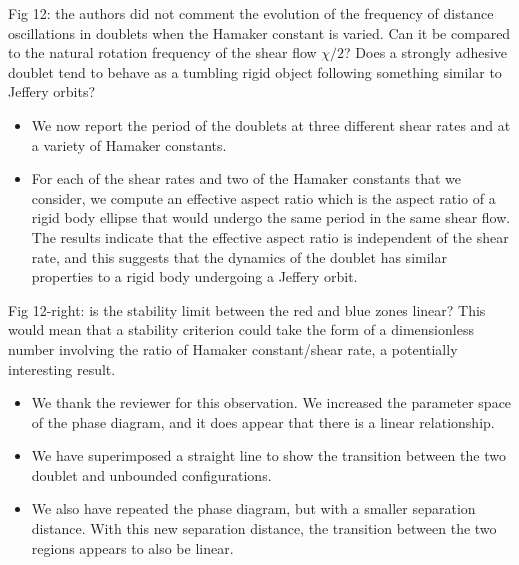 \documentclass[11pt]{article}
\newcommand{\comment}[1]{{\color{blue} #1}}
\begin{document}
\noindent
\comment{Fig 12: the authors did not comment the evolution of the
frequency of distance oscillations in doublets when the Hamaker constant
is varied. Can it be compared to the natural rotation frequency of the
shear flow $\chi/2$? Does a strongly adhesive doublet tend to behave as
a tumbling rigid object following something similar to Jeffery orbits?}
\begin{itemize}
  \item We now report the period of the doublets at three different
    shear rates and at a variety of Hamaker constants.

  \item For each of the shear rates and two of the Hamaker constants
    that we consider, we compute an effective aspect ratio which is the
    aspect ratio of a rigid body ellipse that would undergo the same
    period in the same shear flow.  The results indicate that the
    effective aspect ratio is independent of the shear rate, and this
    suggests that the dynamics of the doublet has similar properties to
    a rigid body undergoing a Jeffery orbit. 
\end{itemize}

\noindent
\comment{Fig 12-right: is the stability limit between the red and blue
zones linear? This would mean that a stability criterion could take
the form of a dimensionless number involving the ratio of Hamaker
constant/shear rate, a potentially interesting result.}
\begin{itemize}
  \item We thank the reviewer for this observation.  We increased the
    parameter space of the phase diagram, and it does appear that there
    is a linear relationship.
  \item We have superimposed a straight line to show the transition
    between the two doublet and unbounded configurations.
  \item We also have repeated the phase diagram, but with a smaller
    separation distance.  With this new separation distance, the
    transition between the two regions appears to also be linear.
\end{itemize}
\end{document}
